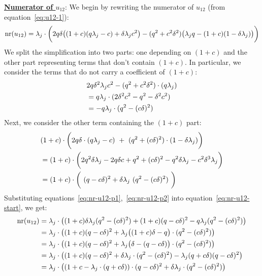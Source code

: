 \underline{\bf Numerator of $u_{12}$}:
We begin by rewriting the numerator of $u_{12}$ (from equation~\ref{eq:u12-1}):
\begin{align}
\label{eq:nr-u12-start}
\text{nr}(u_{12})=\lambda_j\cdot\bigg(2q \delta\big((1+c)(q \lambda_j-c)+\delta\lambda_jc^2\big)-(q ^2+c^2\delta^2)\big(\lambda_jq -(1+c)(1-\delta\lambda_j)\big)\bigg)
\end{align}
We split the simplification into two parts: one depending on $(1+c)$ and the other part representing terms that don't contain $(1+c)$. In particular, we consider the terms that do not carry a coefficient of $(1+c)$:
\begin{align}
\label{eq:nr-u12-p1}
&2q \delta^2\lambda_j c^2-(q ^2+c^2\delta^2)\cdot(q \lambda_j)\nonumber\\
&=q \lambda_j\cdot(2\delta^2c^2-q ^2-\delta^2c^2)\nonumber\\
&=-q \lambda_j\cdot(q ^2-(c\delta)^2)
\end{align}
Next, we consider the other term containing the $(1+c)$ part:
\begin{align}
\label{eq:nr-u12-p2}
&(1+c)\cdot\bigg(2q \delta\cdot(q \lambda_j-c)\ +\ (q ^2+(c\delta)^2)\cdot(1-\delta\lambda_j)\bigg)\nonumber\\
&=(1+c)\cdot\bigg(2q ^2\delta\lambda_j-2q \delta c+q ^2+(c\delta)^2-q ^2\delta\lambda_j-c^2\delta^3\lambda_j\bigg)\nonumber\\
&=(1+c)\cdot\bigg(\ (q -c\delta)^2 + \delta\lambda_j\ (q ^2-(c\delta)^2)\ \bigg)
\end{align}
Substituting equations~\ref{eq:nr-u12-p1},~\ref{eq:nr-u12-p2} into equation~\ref{eq:nr-u12-start}, we get:
\begin{align}
\label{eq:nr-u12}
\text{nr}(u_{12})&=\lambda_j\cdot\big((1+c)\delta\lambda_j(q ^2-(c\delta)^2)+(1+c)(q -c\delta)^2-q \lambda_j(q ^2-(c\delta)^2)\big)\nonumber\\
&=\lambda_j\cdot\big((1+c)(q -c\delta)^2+\lambda_j\big((1+c)\delta-q \big)\cdot(q ^2-(c\delta)^2)\big)\nonumber\\
&=\lambda_j\cdot\big((1+c)(q -c\delta)^2+\lambda_j\big(\delta-(q -c\delta)\big)\cdot(q ^2-(c\delta)^2)\big)\nonumber\\
&=\lambda_j\cdot\big((1+c)(q -c\delta)^2+\delta\lambda_j\cdot(q ^2-(c\delta)^2)-\lambda_j(q +c\delta)(q -c\delta)^2\big)\nonumber\\
&=\lambda_j\cdot\big((1+c-\lambda_j\cdot(q +c\delta))\cdot(q -c\delta)^2+\delta\lambda_j\cdot(q ^2-(c\delta)^2)\big)
\end{align}
